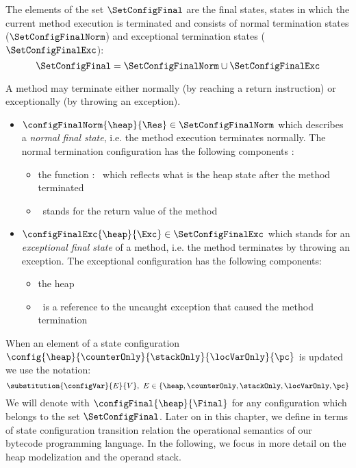  The elements of the set $\SetConfigFinal$ are the final states, states in which the current method execution is terminated and consists of 
 normal termination states ($\SetConfigFinalNorm$) and exceptional termination states ($\SetConfigFinalExc$):
 $$\SetConfigFinal =  \SetConfigFinalNorm   \cup \SetConfigFinalExc $$ 
 
 A method may terminate either normally (by reaching a return instruction) or exceptionally (by throwing an exception).
 
 \begin{itemize}
        \item  $\configFinalNorm{\heap}{\Res} \in \SetConfigFinalNorm $ which describes a \textit{normal final state}, i.e.
	       the method execution terminates normally. The normal termination configuration has the following components :
               \begin{itemize}
                      \item the function \heap : \HeapSet \ which reflects what is the heap state after the method terminated
		      
		      \item \Res \ stands for the return value  of the method
	       \end{itemize}

	\item  $\configFinalExc{\heap}{\Exc} \in \SetConfigFinalExc $ which stands for an 
               \textit{exceptional final state} of a method,
	       i.e. the method terminates by throwing an exception. The exceptional configuration has the following components:
               \begin{itemize}
                      \item the heap \heap 
		      \item \Exc \ is a reference to the uncaught exception that caused the method termination
               \end{itemize}

 \end{itemize}
  
 When an element of a state configuration $\config{\heap}{\counterOnly}{ \stackOnly }{\locVarOnly}{\pc}$ is updated 
 we use the notation: 
 $$ \substitution{\configVar}{ E}{ V}   , \ E \in \{ \heap, \counterOnly, \stackOnly, \locVarOnly, \pc \} $$   
 We will denote with $\configFinal{\heap}{\Final}$ for any configuration which belongs to the set  $\SetConfigFinal$. 
 Later on in this chapter, we define in terms of state configuration transition relation the operational semantics of
 our bytecode programming language.
 In the following, we focus in more detail on the heap modelization and the operand stack. 
